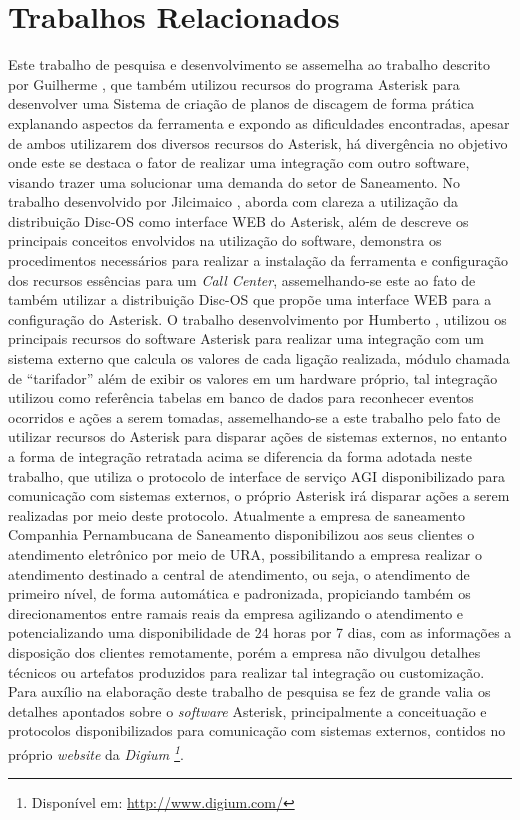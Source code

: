 \section*{Trabalhos Relacionados}
Este trabalho de pesquisa e desenvolvimento se assemelha ao trabalho descrito por Guilherme \cite{VIEIRA:2007}, que também utilizou recursos do programa Asterisk para desenvolver uma Sistema de criação de planos de discagem de forma prática explanando aspectos da ferramenta e expondo as dificuldades encontradas, apesar de ambos utilizarem dos diversos recursos do Asterisk, há divergência no objetivo onde este se destaca o fator de realizar uma integração com outro software, visando trazer uma solucionar uma demanda do setor de Saneamento.  No trabalho desenvolvido por Jilcimaico \cite{DARU:2008}, aborda com clareza a utilização da distribuição Disc-OS como interface WEB do Asterisk, além de descreve os principais conceitos envolvidos na utilização do software, demonstra os procedimentos necessários para realizar a instalação da ferramenta e configuração dos recursos essências para um \textit{Call Center}, assemelhando-se este ao fato de também utilizar a distribuição Disc-OS que propõe uma interface WEB para a configuração do Asterisk.
O trabalho desenvolvimento por Humberto \cite{CAMPOS:2007}, utilizou os principais recursos do software Asterisk para realizar uma integração com um sistema externo que calcula os valores de cada ligação realizada, módulo chamada de “tarifador” além de exibir os valores em um hardware próprio, tal integração utilizou como referência tabelas em banco de dados para reconhecer eventos ocorridos e ações a serem tomadas, assemelhando-se a este trabalho pelo fato de utilizar recursos do Asterisk para disparar ações de sistemas externos, no entanto a forma de integração retratada acima se diferencia da forma adotada neste trabalho, que utiliza o protocolo de interface de serviço AGI disponibilizado para comunicação com sistemas externos, o próprio Asterisk irá disparar ações a serem realizadas por meio deste protocolo.
Atualmente a empresa de saneamento Companhia Pernambucana de Saneamento \cite{COMPESA:URA} disponibilizou aos seus clientes o atendimento eletrônico por meio de URA, possibilitando a empresa realizar o atendimento destinado a central de atendimento, ou seja, o atendimento de primeiro nível, de forma automática e padronizada, propiciando também os direcionamentos entre ramais reais da empresa agilizando o atendimento e potencializando uma disponibilidade de 24 horas por 7 dias, com as informações a disposição dos clientes remotamente, porém a empresa não divulgou detalhes técnicos ou artefatos produzidos para realizar tal integração ou customização.
Para auxílio na elaboração deste trabalho de pesquisa se fez de grande valia os detalhes apontados sobre o \textit{software} Asterisk, principalmente a conceituação e protocolos disponibilizados para comunicação com sistemas externos, contidos no próprio \textit{website} da \textit{Digium \footnote{Disponível em: \url{http://www.digium.com/}}}. 
